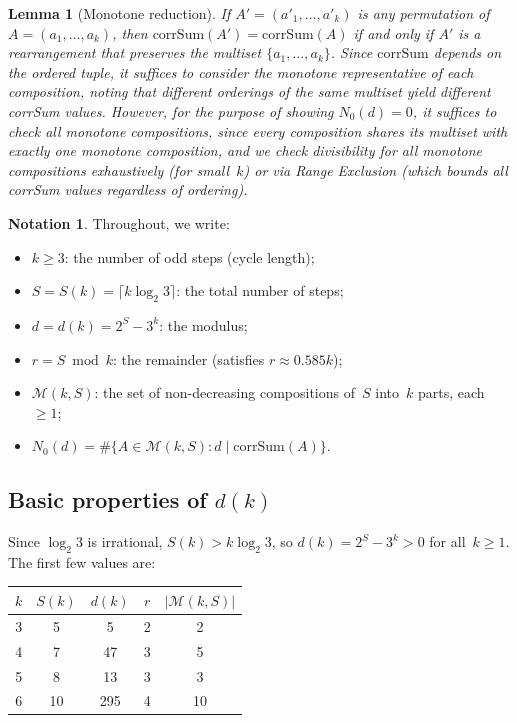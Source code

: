 \documentclass[11pt, a4paper]{amsart}
\theoremstyle{plain}
\newtheorem{lemma}[theorem]{Lemma}
\theoremstyle{definition}
\newtheorem{notation}[theorem]{Notation}
\theoremstyle{remark}
\newcommand{\corrSum}{\mathrm{corrSum}}
\newcommand{\Mono}{\mathcal{M}}
\begin{document}
\begin{lemma}[Monotone reduction]\label{lem:rearrangement}
  If $A' = (a'_1, \ldots, a'_k)$ is any permutation of
  $A = (a_1, \ldots, a_k)$, then $\corrSum(A') = \corrSum(A)$
  if and only if $A'$ is a rearrangement that preserves the
  multiset $\{a_1, \ldots, a_k\}$.  Since $\corrSum$ depends
  on the ordered tuple, it suffices to consider the monotone
  representative of each composition, noting that different
  orderings of the same multiset yield different corrSum values.
  However, for the purpose of showing $N_0(d) = 0$, it suffices
  to check all monotone compositions, since every composition
  shares its multiset with exactly one monotone composition, and
  we check divisibility for all monotone compositions exhaustively
  (for small~$k$) or via Range Exclusion (which bounds all
  corrSum values regardless of ordering).
\end{lemma}

\begin{notation}\label{not:main}
Throughout, we write:
\begin{itemize}
  \item $k \geq 3$: the number of odd steps (cycle length);
  \item $S = S(k) = \lceil k \log_2 3 \rceil$: the total number of
        steps;
  \item $d = d(k) = 2^S - 3^k$: the modulus;
  \item $r = S \bmod k$: the remainder (satisfies $r \approx 0.585k$);
  \item $\Mono(k, S)$: the set of non-decreasing compositions of~$S$
        into~$k$ parts, each $\geq 1$;
  \item $N_0(d) = \#\{A \in \Mono(k,S) : d \mid \corrSum(A)\}$.
\end{itemize}
\end{notation}

\subsection{Basic properties of $d(k)$}\label{ssec:d-properties}

Since $\log_2 3$ is irrational, $S(k) > k \log_2 3$, so
$d(k) = 2^S - 3^k > 0$ for all~$k \geq 1$.
The first few values are:

\begin{center}
\begin{tabular}{ccccc}
\toprule
$k$ & $S(k)$ & $d(k)$ & $r$ & $|\Mono(k,S)|$ \\
\midrule
3 & 5 & 5  & 2 & 2 \\
4 & 7 & 47 & 3 & 5 \\
5 & 8 & 13 & 3 & 3 \\
6 & 10 & 295 & 4 & 10 \\
\bottomrule
\end{tabular}
\end{center}
\end{document}
